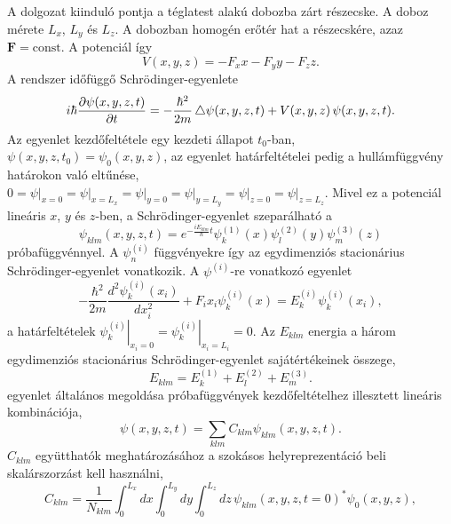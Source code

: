 A dolgozat kiinduló pontja a téglatest alakú dobozba zárt részecske. A doboz mérete $L_x$, $L_y$ és $L_z$. A dobozban homogén erőtér hat a részecskére, azaz $\boldsymbol{F} = \text{const}$. A potenciál így
\begin{equation}
	V(x, y, z) = -F_xx-F_yy-F_zz.
\end{equation}
A rendszer időfüggő Schrödinger-egyenlete
\begin{equation}
	i\hbar\frac{\partial \psi(x, y, z, t)}{\partial t} = -\frac{\hbar^2}{2m} \mathop{}\!\mathbin\bigtriangleup \psi(x, y, z, t) + V(x, y, z)\,\psi(x, y, z, t).
	\label{3dbox:3dscheq}
\end{equation}
Az egyenlet kezdőfeltétele egy kezdeti állapot $t_0$-ban, $\psi(x, y, z, t_0) = \psi_0(x, y, z)$, az egyenlet határfeltételei pedig a hullámfüggvény határokon való eltűnése, $0=\left.\psi\right|_{x=0}=\left.\psi\right|_{x=L_x}=\left.\psi\right|_{y=0}=\left.\psi\right|_{y=L_y}=\left.\psi\right|_{z=0}=\left.\psi\right|_{z=L_z}$. Mivel ez a potenciál lineáris $x$, $y$ és $z$-ben, a Schrödinger-egyenlet szeparálható a
\begin{equation}
	\psi_{klm}(x, y, z, t) = e^{-\frac{iE_{klm}}{\hbar}t}\psi^{(1)}_k(x)\psi^{(2)}_l(y)\psi^{(3)}_m(z)
	\label{3dox:3dansatz}
\end{equation}
próbafüggvénnyel. A $\psi^{(i)}_n$ függvényekre így az egydimenziós stacionárius Schrödinger-egyenlet vonatkozik. A $\psi^{(i)}$-re vonatkozó egyenlet 
\begin{equation}
	-\frac{\hbar^2}{2m}\frac{d^2\psi^{(i)}_k(x_i)}{dx_i^2} + F_ix_i\psi^{(i)}_k(x) = E^{(i)}_k\psi^{(i)}_k(x_i),
	\label{3dbox:1deq}
\end{equation}
a határfeltételek $\left.\psi^{(i)}_k\right|_{x_i=0}=\left.\psi^{(i)}_k\right|_{x_i=L_i}=0$. Az $E_{klm}$ energia a három egydimenziós stacionárius Schrödinger-egyenlet sajátértékeinek összege,
\begin{equation}
	E_{klm} = E^{(1)}_k+E^{(2)}_l+E^{(3)}_m.
\end{equation}
 egyenlet általános megoldása  próbafüggvények kezdőfeltételhez illesztett lineáris kombinációja,
\begin{equation}
	\psi(x,y,z,t) = \sum_{klm}C_{klm}\psi_{klm}(x,y,z,t).
	\label{3dbox:timeevolution}
\end{equation}
$C_{klm}$ együtthatók meghatározásához a szokásos helyreprezentáció beli skalárszorzást kell használni,
\begin{equation}
	C_{klm} = \frac{1}{N_{klm}}\int_0^{L_x}dx\int_0^{L_y}dy\int_0^{L_z}dz\,\psi_{klm}(x, y, z, t=0)^*\psi_0(x, y, z),
	\label{3dbox:ceq}
\end{equation}
